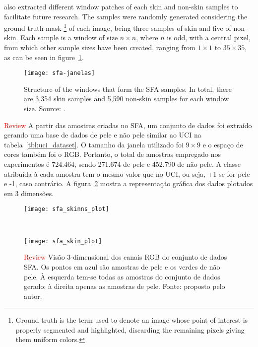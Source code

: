 \citet{sfa-skin-dataset:13} also extracted different window patches of each skin and non-skin samples to facilitate future research. The samples were randomly generated considering the ground truth mask \footnote{Ground truth is the term used to denote an image whose point of interest is properly segmented and highlighted, discarding the remaining pixels giving them uniform colors.} of each image, being three samples of skin and five of non-skin. Each sample is a window of size $n \times n$, where $n$ is odd, with a central pixel, from which other sample sizes have been created, ranging from $1 \times 1$ to $35 \times 35$, as can be seen in figure~\ref{fig:sfa_dataset_janelas}.

\begin{figure}[ht]
  \centering
  \texttt{[image: sfa-janelas]}
  \caption[Structure of the windows that form the SFA samples]{Structure of the windows that form the SFA samples. In total, there are 3,354 skin samples and 5,590 non-skin samples for each window size. Source: \citet{sfa-skin-dataset:13}.}
  \label{fig:sfa_dataset_janelas}
\end{figure}

\textcolor{red}{Review} A partir das amostras criadas no SFA, um conjunto de dados foi extraído gerando uma base de dados de pele e não pele similar ao UCI na tabela~\ref{tbl:uci_dataset}. O tamanho da janela utilizado foi $9 \times 9$ e o espaço de cores também foi o RGB. Portanto, o total de amostras empregado nos experimentos é 724.464, sendo 271.674 de pele e 452.790 de não pele. A classe atribuída à cada amostra tem o mesmo valor que no UCI, ou seja, +1 se for pele e -1, caso contrário. A figura~\ref{fig:dataset_sfa} mostra a representação gráfica dos dados plotados em 3 dimensões.
\begin{figure}[hb]
    \centering
    \begin{minipage}{0.45\textwidth}
        \texttt{[image: sfa\_skinns\_plot]}
    \end{minipage}
    ~ %
    \begin{minipage}{0.45\textwidth}
        \texttt{[image: sfa\_skin\_plot]}
    \end{minipage}
    \caption[Visão 3-dimensional dos canais RGB do conjunto de dados SFA]{\textcolor{red}{Review} Visão 3-dimensional dos canais RGB do conjunto de dados SFA. Os pontos em azul são amostras de pele e os verdes de não pele. À esquerda tem-se todas as amostras do conjunto de dados gerado; à direita apenas as amostras de pele. Fonte: proposto pelo autor.}
    \label{fig:dataset_sfa}
\end{figure}

